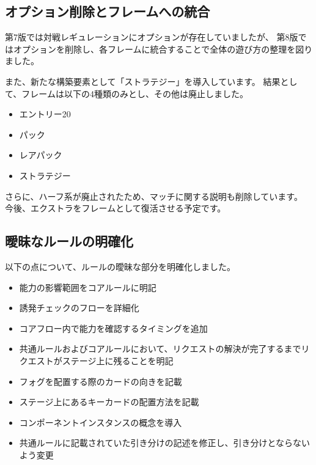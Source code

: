 \documentclass[letterpaper,10pt,dvipdfmx]{sphinxmanual}
\begin{document}
\subsection{オプション削除とフレームへの統合}
\label{\detokenize{revision-history/8th:id5}}
\sphinxAtStartPar
第7版では対戦レギュレーションにオプションが存在していましたが、
第8版ではオプションを削除し、各フレームに統合することで全体の遊び方の整理を図りました。

\sphinxAtStartPar
また、新たな構築要素として「ストラテジー」を導入しています。
結果として、フレームは以下の4種類のみとし、その他は廃止しました。
\begin{itemize}
\item {} 
\sphinxAtStartPar
エントリー20

\item {} 
\sphinxAtStartPar
パック

\item {} 
\sphinxAtStartPar
レアパック

\item {} 
\sphinxAtStartPar
ストラテジー

\end{itemize}

\sphinxAtStartPar
さらに、ハーフ系が廃止されたため、マッチに関する説明も削除しています。
今後、エクストラをフレームとして復活させる予定です。


\subsection{曖昧なルールの明確化}
\label{\detokenize{revision-history/8th:id6}}
\sphinxAtStartPar
以下の点について、ルールの曖昧な部分を明確化しました。
\begin{itemize}
\item {} 
\sphinxAtStartPar
能力の影響範囲をコアルールに明記

\item {} 
\sphinxAtStartPar
誘発チェックのフローを詳細化

\item {} 
\sphinxAtStartPar
コアフロー内で能力を確認するタイミングを追加

\item {} 
\sphinxAtStartPar
共通ルールおよびコアルールにおいて、リクエストの解決が完了するまでリクエストがステージ上に残ることを明記

\item {} 
\sphinxAtStartPar
フォグを配置する際のカードの向きを記載

\item {} 
\sphinxAtStartPar
ステージ上にあるキーカードの配置方法を記載

\item {} 
\sphinxAtStartPar
コンポーネントインスタンスの概念を導入

\item {} 
\sphinxAtStartPar
共通ルールに記載されていた引き分けの記述を修正し、引き分けとならないよう変更

\end{itemize}
\end{document}
